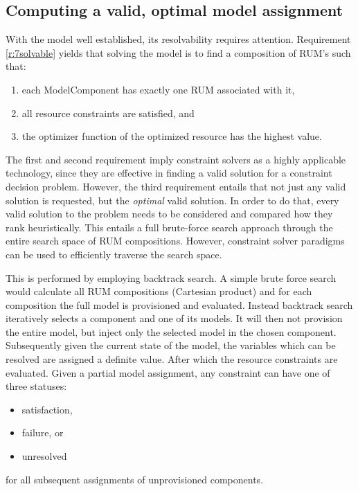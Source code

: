 \subsection{Computing a valid, optimal model assignment}
With the model well established, its resolvability requires attention. Requirement \ref{r:7solvable} yields that solving the model is to find a composition of RUM's such that:
\begin{enumerate}
\nospace
\item each ModelComponent has exactly one RUM associated with it,
\item all resource constraints are satisfied, and
\item the optimizer function of the optimized resource has the highest value.
\end{enumerate}
The first and second requirement imply constraint solvers as a highly applicable technology, since they are effective in finding a valid solution for a constraint decision problem. However, the third requirement entails that not just any valid solution is requested, but the \emph{optimal} valid solution. In order to do that, every valid solution to the problem needs to be considered and compared how they rank heuristically. This entails a full brute-force search approach through the entire search space of RUM compositions. However, constraint solver paradigms can be used to efficiently traverse the search space.

This is performed by employing backtrack search. A simple brute force search would calculate all RUM compositions (Cartesian product) and for each composition the full model is provisioned and evaluated. Instead backtrack search iteratively selects a component and one of its models. It will then not provision the entire model, but inject only the selected model in the chosen component. Subsequently given the current state of the model, the variables which can be resolved are assigned a definite value. After which the resource constraints are evaluated. Given a partial model assignment, any constraint can have one of three statuses:
\begin{itemize}
\nospace
\item satisfaction,
\item failure, or
\item unresolved
\end{itemize}
for all subsequent assignments of unprovisioned components.

